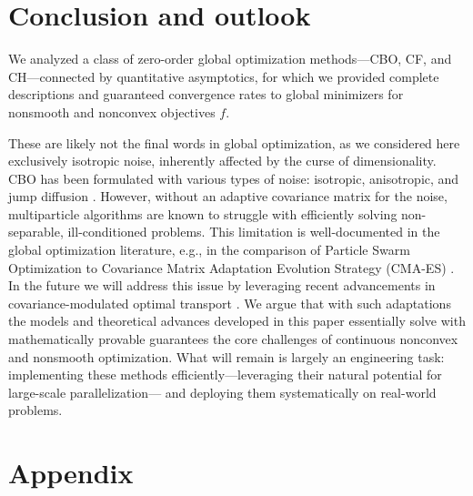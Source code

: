 \documentclass[reqno]{amsart}
\numberwithin{algorithm}{section}
\begin{document}
{\section{Conclusion and outlook}

{We analyzed a class of zero-order global optimization methods---CBO, CF, and CH---connected by quantitative asymptotics, for which we provided complete descriptions and guaranteed convergence rates to global minimizers for nonsmooth and nonconvex objectives $f$.

These are likely not the final words in global optimization, as we considered here exclusively isotropic noise, inherently affected by the curse of dimensionality. CBO has been formulated with various types of noise: isotropic, anisotropic, and jump diffusion \cite{pinnau2017consensus, carrillo2019consensus, kalise2022consensus}. %
However, without an adaptive covariance matrix for the noise,  multiparticle algorithms are known to struggle with efficiently solving non-separable, ill-conditioned problems. This limitation is well-documented in the global optimization literature, e.g., in the comparison of Particle Swarm Optimization  to Covariance Matrix Adaptation Evolution Strategy (CMA-ES) \cite{HANSEN20115755}. In the future we will address this issue by leveraging recent advancements in covariance-modulated optimal transport \cite{burger2023covariancemodulated,carrillo2022consensus}.
We argue that with such adaptations the models and theoretical advances developed in this paper essentially solve with mathematically provable guarantees the core challenges of continuous nonconvex and nonsmooth optimization. What will remain is largely an engineering task: implementing these methods efficiently—leveraging  their natural potential for large-scale parallelization— and deploying them systematically on real-world problems.}



\section{Appendix}

}
\end{document}
